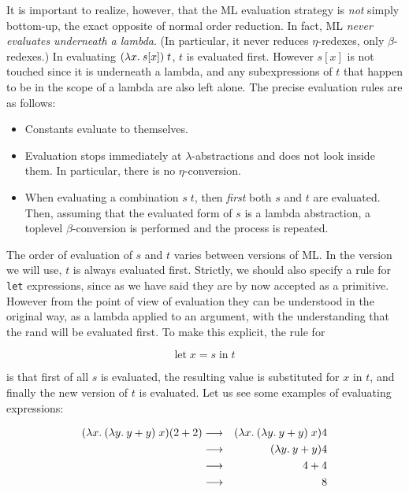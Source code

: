 It is important to realize, however, that the ML evaluation strategy is {\em
not} simply bottom-up, the exact opposite of normal order reduction. In fact,
ML {\em never evaluates underneath a lambda}. (In particular, it never reduces
$\eta$-redexes, only $\beta$-redexes.) In evaluating $(\lambda x.\: s[x])\; t$, $t$
is evaluated first. However $s[x]$ is not touched since it is underneath a
lambda, and any subexpressions of $t$ that happen to be in the scope of a
lambda are also left alone. The precise evaluation rules are as follows:

\begin{itemize}

\item Constants evaluate to themselves.

\item Evaluation stops immediately at $\lambda$-abstractions and does not look
inside them. In particular, there is no $\eta$-conversion.

\item When evaluating a combination $s\; t$, then {\em first} both $s$ and
$t$ are evaluated. Then, assuming that the evaluated form of
$s$ is a lambda abstraction, a toplevel $\beta$-conversion is performed
and the process is repeated.

\end{itemize}

The order of evaluation of $s$ and $t$ varies between versions of ML. In the
version we will use, $t$ is always evaluated first. Strictly, we should also
specify a rule for {\tt let} expressions, since as we have said they are by now
accepted as a primitive. However from the point of view of evaluation they can
be understood in the original way, as a lambda applied to an argument, with the
understanding that the rand will be evaluated first. To make this explicit, the
rule for

$$ \mbox{let}\; x = s\; \mbox{in}\; t $$

\noindent is that first of all $s$ is evaluated, the resulting value is
substituted for $x$ in $t$, and finally the new version of $t$ is evaluated.
Let us see some examples of evaluating expressions:

\begin{eqnarray*}
(\lambda x.\: (\lambda y.\: y + y)\; x) (2 + 2)
& \longrightarrow & (\lambda x.\: (\lambda y.\: y + y)\; x) 4   \\
& \longrightarrow & (\lambda y.\: y + y) 4                  \\
& \longrightarrow & 4 + 4                               \\
& \longrightarrow & 8
\end{eqnarray*}

